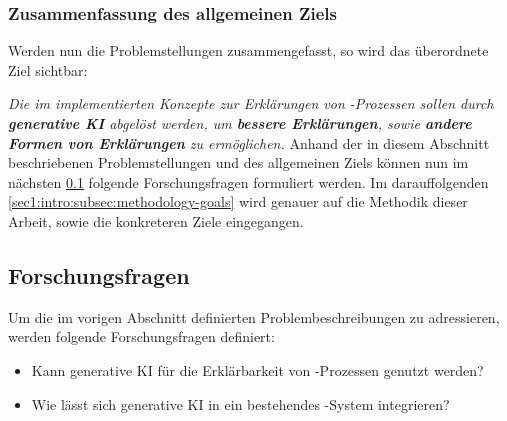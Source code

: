 \subsubsection*{Zusammenfassung des allgemeinen Ziels}
Werden nun die Problemstellungen zusammengefasst, so wird das überordnete Ziel sichtbar:
\med
\par
\textit{Die im \gmaf{} implementierten Konzepte zur Erklärungen von \mmir{}-Prozessen sollen durch \textbf{generative KI} abgelöst werden, um \textbf{bessere Erklärungen}, sowie \textbf{andere Formen von Erklärungen} zu ermöglichen.}
\med
Anhand der in diesem Abschnitt beschriebenen Problemstellungen und des allgemeinen Ziels können nun im nächsten \cref{sec1:intro:subsec:research-questions} folgende Forschungsfragen formuliert werden. Im darauffolgenden \cref{sec1:intro:subsec:methodology-goals} wird genauer auf die Methodik dieser Arbeit, sowie die konkreteren Ziele eingegangen.

\subsection{Forschungsfragen}
\label{sec1:intro:subsec:research-questions}
Um die im vorigen Abschnitt definierten Problembeschreibungen zu adressieren, werden folgende Forschungsfragen definiert:
\begin{itemize}
    \item \researchquestion{} Kann generative KI für die Erklärbarkeit von \mmir{}-Prozessen genutzt werden?
    \item \researchquestion{} Wie lässt sich generative KI in ein bestehendes \mmir{}-System integrieren?
\end{itemize}

